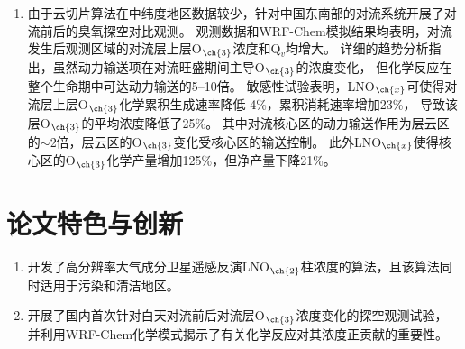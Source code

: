 \begin{enumerate}[label=（\arabic*）, labelindent=\parindent, nosep, leftmargin=0pt, widest=0, itemindent=*, topsep=0pt, partopsep=0pt, parsep=0pt]
\item 由于云切片算法在中纬度地区数据较少，针对中国东南部的对流系统开展了对流前后的臭氧探空对比观测。
观测数据和WRF-Chem模拟结果均表明，对流发生后观测区域的对流层上层O$_{\ch{3}}$浓度和Q$_v$均增大。
详细的趋势分析指出，虽然动力输送项在对流旺盛期间主导O$_{\ch{3}}$的浓度变化，
但化学反应在整个生命期中可达动力输送的5--10倍。
敏感性试验表明，LNO$_{\ch{x}}$可使得对流层上层O$_{\ch{3}}$化学累积生成速率降低 4\%，累积消耗速率增加23\%，
导致该层O$_{\ch{3}}$的平均浓度降低了25\%。
其中对流核心区的动力输送作用为层云区的$\sim$2倍，层云区的O$_{\ch{3}}$变化受核心区的输送控制。
此外LNO$_{\ch{x}}$使得核心区的O$_{\ch{3}}$化学产量增加125\%，但净产量下降21\%。


\end{enumerate}

\section{论文特色与创新}

\begin{enumerate}[label=（\arabic*）, labelindent=\parindent, nosep, leftmargin=0pt, widest=0, itemindent=*, topsep=0pt, partopsep=0pt, parsep=0pt]

\item 开发了高分辨率大气成分卫星遥感反演LNO$_{\ch{2}}$柱浓度的算法，且该算法同时适用于污染和清洁地区。

\item 开展了国内首次针对白天对流前后对流层O$_{\ch{3}}$浓度变化的探空观测试验，
并利用WRF-Chem化学模式揭示了有关化学反应对其浓度正贡献的重要性。





\end{enumerate}




